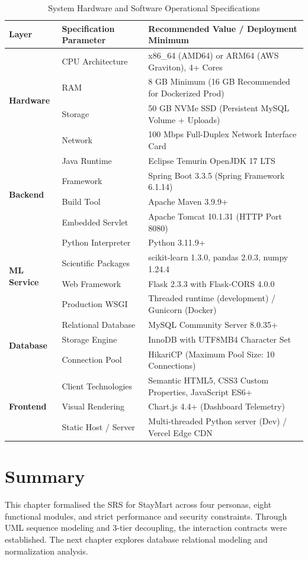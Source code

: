 \begin{table}[htbp]
\centering
\caption{System Hardware and Software Operational Specifications}
\label{tab:environment_specs}
\footnotesize
\begin{tabularx}{\textwidth}{lp{4.2cm}X}
\toprule
\textbf{Layer} & \textbf{Specification Parameter} & \textbf{Recommended Value / Deployment Minimum} \\
\midrule
\multirow{4}{*}{\textbf{Hardware}} & CPU Architecture & x86\_64 (AMD64) or ARM64 (AWS Graviton), 4+ Cores \\
& RAM & 8 GB Minimum (16 GB Recommended for Dockerized Prod) \\
& Storage & 50 GB NVMe SSD (Persistent MySQL Volume + Uploads) \\
& Network & 100 Mbps Full-Duplex Network Interface Card \\
\midrule
\multirow{4}{*}{\textbf{Backend}} & Java Runtime & Eclipse Temurin OpenJDK 17 LTS \\
& Framework & Spring Boot 3.3.5 (Spring Framework 6.1.14) \\
& Build Tool & Apache Maven 3.9.9+ \\
& Embedded Servlet & Apache Tomcat 10.1.31 (HTTP Port 8080) \\
\midrule
\multirow{4}{*}{\textbf{ML Service}} & Python Interpreter & Python 3.11.9+ \\
& Scientific Packages & scikit-learn 1.3.0, pandas 2.0.3, numpy 1.24.4 \\
& Web Framework & Flask 2.3.3 with Flask-CORS 4.0.0 \\
& Production WSGI & Threaded runtime (development) / Gunicorn (Docker) \\
\midrule
\multirow{3}{*}{\textbf{Database}} & Relational Database & MySQL Community Server 8.0.35+ \\
& Storage Engine & InnoDB with UTF8MB4 Character Set \\
& Connection Pool & HikariCP (Maximum Pool Size: 10 Connections) \\
\midrule
\multirow{3}{*}{\textbf{Frontend}} & Client Technologies & Semantic HTML5, CSS3 Custom Properties, JavaScript ES6+ \\
& Visual Rendering & Chart.js 4.4+ (Dashboard Telemetry) \\
& Static Host / Server & Multi-threaded Python server (Dev) / Vercel Edge CDN \\
\bottomrule
\end{tabularx}
\end{table}

\section{Summary}
This chapter formalised the SRS for StayMart across four personas, eight functional modules, and strict performance and security constraints. Through UML sequence modeling and 3-tier decoupling, the interaction contracts were established. The next chapter explores database relational modeling and normalization analysis.
